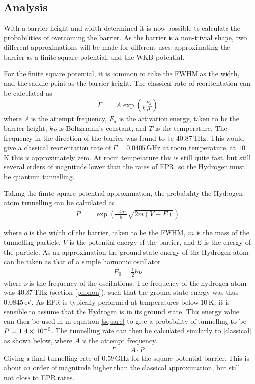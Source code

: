 \documentclass[10pt,a4paper,twocolumn,twoside]{extarticle}
\begin{document}
\subsection{Analysis}
With a barrier height and width determined it is now possible to calculate the probabilities of overcoming the barrier. As the barrier is a non-trivial shape, two different approximations will be made for different uses: approximating the barrier as a finite square potential, and the WKB potential. 

For the finite square potential, it is common to take the FWHM as the width, and the saddle point as the barrier height. The classical rate of reoritentation can be calculated as 
\begin{align}
    \label{classical}
    \Gamma &= A\exp({\frac{-E_a}{k_BT}})
\end{align}
where $A$ is the attempt frequency, $E_a$ is the activation energy, taken to be the barrier height, $k_B$ is Boltzmann's constant, and $T$ is the temperature. The frequency in the direction of the barrier was found to be $40.87$\,THz. This would give a classical reorientation rate of $\Gamma = 0.0405$\,GHz at room temperature, at $10$\,K this is approximately zero. At room temperature this is still quite fast, but still several orders of magnitude lower than the rates of EPR, so the Hydrogen must be quantum tunnelling.

Taking the finite square potential approximation, the probability the Hydrogen atom tunnelling can be calculated as 
\begin{align}
    \label{square}
    P &= \exp(\frac{-4a\pi}{h}\sqrt{2m(V-E)})
\end{align}

where $a$ is the width of the barrier, taken to be the FWHM, $m$ is the mass of the tunnelling particle, $V$ is the potential energy of the barrier, and $E$ is the energy of the particle. As an approximation the ground state energy of the Hydrogen atom can be taken as that of a simple harmonic oscillator 
\begin{align}
    E_0 = \frac{1}{2}h\nu
\end{align}
where $\nu$ is the frequency of the oscillations. The frequency of the hydrogen atom was $40.87$\,THz (section \ref{phonon}), such that the ground state energy was thus $0.0845$\,eV. As EPR is typically performed at temperatures below $10$\,K, it is sensible to assume that the Hydrogen is in its ground state. This energy value can then be used in in equation \ref{square} to give a probability of tunnelling to be $P = 1.4\cross10^{-5}$. The tunnelling rate can then be calculated similarly to \ref{classical} as shown below, where $A$ is the attempt frequency. 
\begin{align}
    \Gamma &= A\cdot P
\end{align}
Giving a final tunnelling rate of $0.59$\,GHz for the square potential barrier. This is about an order of magnitude higher than the classical approximation, but still not close to EPR rates.
\end{document}
